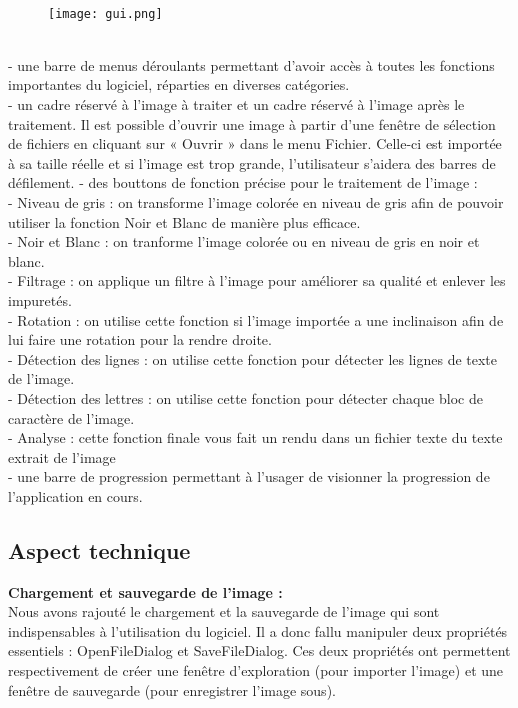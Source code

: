 \documentclass{article}
\begin{document}
\\
\begin{figure}[hp]
	\centering
    \texttt{[image: gui.png]}
	 \label{Dernier GUI}
\end{figure}
\\
- une barre de menus déroulants permettant d’avoir accès à toutes les fonctions importantes
du logiciel, réparties en diverses catégories.\\
- un cadre réservé à l’image à traiter et un cadre réservé à l’image après le traitement.
Il est possible d’ouvrir une image à partir d’une fenêtre de sélection de fichiers en cliquant
sur « Ouvrir » dans le menu Fichier. Celle-ci est importée à sa taille réelle et si
l’image est trop grande, l’utilisateur s’aidera des barres de défilement.
- des bouttons de fonction précise pour le traitement de l’image :\\
	- Niveau de gris : on transforme l'image colorée en niveau de gris afin de pouvoir   utiliser la fonction Noir et Blanc de manière plus efficace.\\
	- Noir et Blanc : on tranforme l'image colorée ou en niveau de gris en noir et blanc.\\
	- Filtrage : on applique un filtre à l’image pour améliorer sa qualité et enlever les impuretés.\\
	- Rotation : on utilise cette fonction si l'image importée a une inclinaison afin de lui  faire une rotation pour la rendre droite.\\
	- Détection des lignes : on utilise cette fonction pour détecter les lignes de texte de l'image.\\
	- Détection des lettres : on utilise cette fonction pour détecter chaque bloc de 	caractère de l'image.\\
	- Analyse : cette fonction finale vous fait un rendu dans un fichier texte du texte extrait  de l'image \\
- une barre de progression permettant à l’usager de visionner la progression de l’application
en cours.\\




              \subsection{Aspect technique}
\textbf{Chargement et sauvegarde de l'image :}\\
Nous avons rajouté le chargement et la sauvegarde de l’image qui sont indispensables à l’utilisation du logiciel. Il a donc fallu manipuler deux propriétés essentiels : OpenFileDialog et SaveFileDialog. Ces deux propriétés ont permettent respectivement de créer une fenêtre d’exploration (pour importer l’image) et une fenêtre de sauvegarde (pour enregistrer l’image sous).\\
\end{document}
